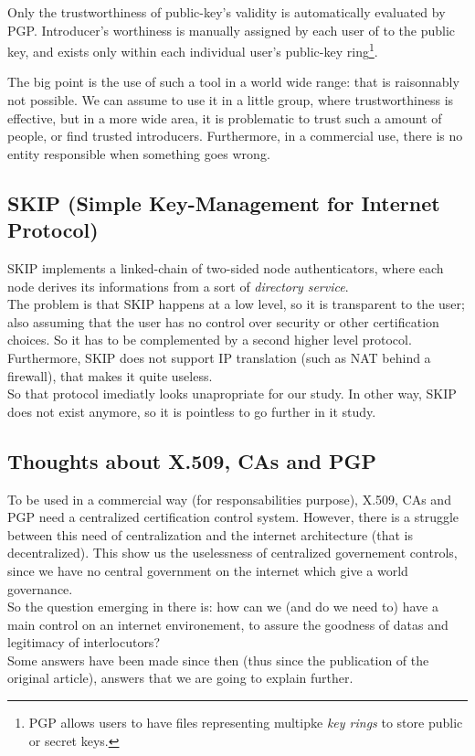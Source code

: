 \documentclass[journal, a4paper]{IEEEtran}
\begin{document}
Only the trustworthiness of public-key's validity is automatically evaluated by PGP. Introducer's worthiness is manually assigned by each user of to the public key, and exists only within each individual user's public-key ring\footnote{PGP allows users to have files representing multipke \textit{key rings} to store public or secret keys\cite{caronni2000}.}.

The big point is the use of such a tool in a world wide range: that is raisonnably not possible. We can assume to use it in a little group, where trustworthiness is effective, but in a more wide area, it is problematic to trust such a amount of people, or find trusted introducers. Furthermore, in a commercial use, there is no entity responsible when something goes wrong.


\subsection{SKIP (Simple Key-Management for Internet Protocol)}
\label{skip}

SKIP implements a linked-chain of two-sided node authenticators, where each node derives its informations from a sort of \textit{directory service}.\\
The problem is that SKIP happens at a low level, so it is transparent to the user; also assuming that the user has no control over security or other certification choices. So it has to be complemented by a second higher level protocol. Furthermore, SKIP does not support IP translation (such as NAT behind a firewall), that makes it quite useless.\\
So that protocol imediatly looks unapropriate for our study. In other way, SKIP does not exist anymore, so it is pointless to go further in it study.


\subsection{Thoughts about X.509, CAs and PGP}
\label{thoughts_old}

To be used in a commercial way (for responsabilities purpose), X.509, CAs and PGP need a centralized certification control system. However, there is a struggle between this need of centralization and the internet architecture (that is decentralized). This show us the uselessness of centralized governement controls, since we have no central government on the internet which give a world governance.\\
So the question emerging in there is: how can we (and do we need to) have a main control on an internet environement, to assure the goodness of datas and legitimacy of interlocutors?\\
Some answers have been made since then (thus since the publication of the original article), answers that we are going to explain further.
\end{document}
